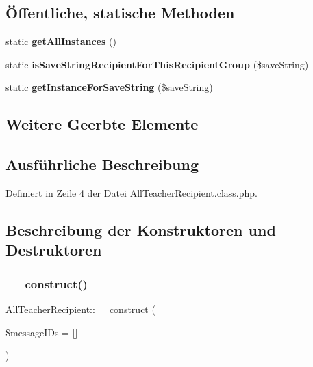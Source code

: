 \subsection*{Öffentliche, statische Methoden}
\begin{DoxyCompactItemize}
\item 
\mbox{\label{class_all_teacher_recipient_a54272c96aae7646ed169f60d1c7e5327}} 
static {\bfseries get\+All\+Instances} ()
\item 
\mbox{\label{class_all_teacher_recipient_a60e0ef0380209f7b3c1cb7f26eb9fc78}} 
static {\bfseries is\+Save\+String\+Recipient\+For\+This\+Recipient\+Group} (\$save\+String)
\item 
\mbox{\label{class_all_teacher_recipient_a07bf2c932890475478438706a8321844}} 
static {\bfseries get\+Instance\+For\+Save\+String} (\$save\+String)
\end{DoxyCompactItemize}
\subsection*{Weitere Geerbte Elemente}


\subsection{Ausführliche Beschreibung}


Definiert in Zeile 4 der Datei All\+Teacher\+Recipient.\+class.\+php.



\subsection{Beschreibung der Konstruktoren und Destruktoren}
\mbox{\label{class_all_teacher_recipient_ad7152dc4116e3ee9fd1293cd73b743c2}} 
\subsubsection{\texorpdfstring{\+\_\+\+\_\+construct()}{\_\_construct()}}
{\footnotesize\ttfamily All\+Teacher\+Recipient\+::\+\_\+\+\_\+construct (\begin{DoxyParamCaption}\item[{}]{\$message\+I\+Ds = {\ttfamily \mbox{[}\mbox{]}} }\end{DoxyParamCaption})}

